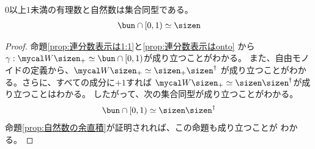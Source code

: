 	\begin{proposition}[有理数と自然数は集合同型]
	\label{prop:有理数と自然数は集合同型} %
		$0$以上$1$未満の有理数と自然数は集合同型である。
		\begin{equation*}\begin{split}
			\bun\cap[0,1)\simeq \sizen
		\end{split}\end{equation*}
	\end{proposition} %
	\begin{proof} 命題\ref{prop:連分数表示は1:1}と\ref{prop:連分数表示はonto}
	から$\gamma:\Word\sizen_+\simeq \bun\cap[0,1)$が成り立つことがわかる。
	また、自由モノイドの定義から、$\Word\sizen_+\simeq \sizen_+\sizen^\dag$
	が成り立つことがわかる。さらに、すべての成分に$+1$すれば
	$\Word\sizen_+\simeq \sizen\sizen^\dag$が成り立つことはわかる。
	したがって、次の集合同型が成り立つことがわかる。
	\begin{equation*}\begin{split}
		\bun\cap[0,1)\simeq \sizen\sizen^\dag
	\end{split}\end{equation*}
	命題\ref{prop:自然数の余直積}が証明されれば、この命題も成り立つことが
	わかる。
	\end{proof}

